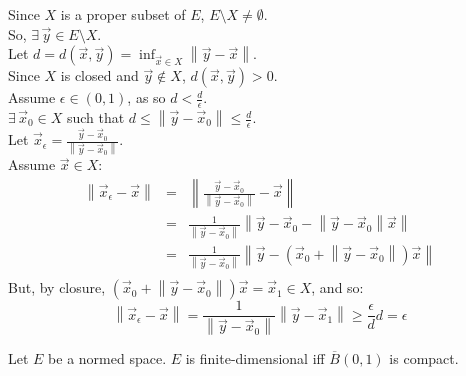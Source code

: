 \documentclass[letterpaper,12pt,fleqn]{article}
\newcommand{\vx}{\vec{x}}
\newcommand{\vy}{\vec{y}}
\newcommand{\vo}{\vec{0}}
\newcommand{\norm}[1]{\left\|#1\right\|}
\newcommand{\cl}[1]{\overline{#1}}
\newcommand{\e}{\epsilon}
\begin{document}

\begin{theproof}
  Since $X$ is a proper subset of $E$, $E\setminus X\ne\emptyset$. \\
  So, $\exists\,\vy\in E\setminus X$. \\
  Let $d=d(\vx,\vy)=\inf_{\vx\in X}\norm{\vy-\vx}$. \\
  Since $X$ is closed and $\vy\notin X$, $d(\vx,\vy)>0$. \\
  Assume $\e\in(0,1)$, as so $d<\frac{d}{\e}$. \\
  $\exists\,\vx_0\in X$ such that $d\le\norm{\vy-\vx_0}\le\frac{d}{\e}$. \\
  Let $\vx_{\e}=\frac{\vy-\vx_0}{\norm{\vy-\vx_0}}$. \\
  Assume $\vx\in X$:
  \begin{eqnarray*}
    \norm{\vx_{\e}-\vx} &=& \norm{\frac{\vy-\vx_0}{\norm{\vy-\vx_0}}-\vx} \\
    &=& \frac{1}{\norm{\vy-\vx_0}}\norm{\vy-\vx_0-\norm{\vy-\vx_0}\vx} \\
    &=& \frac{1}{\norm{\vy-\vx_0}}
    \norm{\vy-\left(\vx_0+\norm{\vy-\vx_0}\right)\vx} \\
  \end{eqnarray*}
  But, by closure, $\left(\vx_0+\norm{\vy-\vx_0}\right)\vx=\vx_1\in X$, and so:
  \[\norm{\vx_{\e}-\vx}=\frac{1}{\norm{\vy-\vx_0}}\norm{\vy-\vx_1}\ge
  \frac{\e}{d}d=\e\]
\end{theproof}

\begin{theorem}
  Let $E$ be a normed space. $E$ is finite-dimensional iff $\cl{B}(0,1)$ is
  compact.
\end{theorem}
\end{document}
